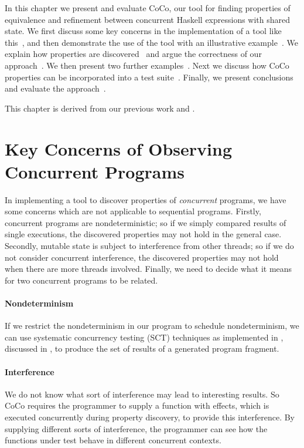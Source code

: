 In this chapter we present and evaluate CoCo, our tool for finding
properties of equivalence and refinement between concurrent Haskell
expressions with shared state.  We first discuss some key concerns in
the implementation of a tool like this~, and then
demonstrate the use of the tool with an illustrative
example~.  We explain how properties are
discovered~ and argue the correctness of our
approach~.  We then present two further
examples~.  Next we discuss how CoCo properties can
be incorporated into a \dejafu{} test suite~.
Finally, we present conclusions and evaluate the
approach~.

This chapter is derived from our previous work \cite{tfp-coco} and
\cite{flops-coco}.

\section{Key Concerns of Observing Concurrent Programs}
\label{sec:coco-concerns}

In implementing a tool to discover properties of \emph{concurrent}
programs, we have some concerns which are not applicable to sequential
programs.  Firstly, concurrent programs are nondeterministic; so if we
simply compared results of single executions, the discovered
properties may not hold in the general case.  Secondly, mutable state
is subject to interference from other threads; so if we do not
consider concurrent interference, the discovered properties may not
hold when there are more threads involved.  Finally, we need to decide
what it means for two concurrent programs to be related.

\paragraph{Nondeterminism}
If we restrict the nondeterminism in our program to schedule
nondeterminism, we can use systematic concurrency testing
(SCT)\cite{coons2013,flanagan2005,musuvathi2008,musuvathi2007}
techniques as implemented in \dejafu{}, discussed in
, to produce the set of results of a generated
program fragment.

\paragraph{Interference}
We do not know what sort of interference may lead to interesting
results.  So CoCo requires the programmer to supply a function with
effects, which is executed concurrently during property discovery, to
provide this interference.  By supplying different sorts of
interference, the programmer can see how the functions under test
behave in different concurrent contexts.

